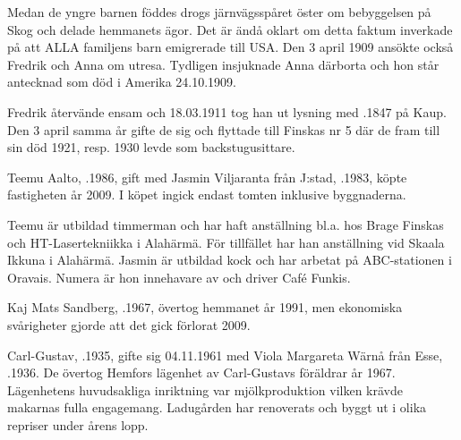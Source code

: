 Medan de yngre barnen föddes drogs järnvägsspåret öster om bebyggelsen på Skog och delade hemmanets ägor. Det är ändå oklart om detta faktum inverkade på att ALLA familjens barn emigrerade till USA. Den 3 april 1909 ansökte också Fredrik och Anna om utresa. Tydligen insjuknade Anna därborta och hon står antecknad som död i Amerika 24.10.1909.

Fredrik återvände ensam och 18.03.1911 tog han ut lysning med  .1847 på Kaup. Den 3 april samma år gifte de sig och flyttade till Finskas nr 5 där de fram till sin död 1921, resp. 1930 levde som backstugusittare.






Teemu Aalto, .1986, gift med Jasmin Viljaranta från J:stad, .1983, köpte fastigheten år 2009. I köpet ingick endast tomten inklusive byggnaderna.

Teemu är utbildad timmerman och har haft anställning bl.a. hos Brage Finskas och HT-Lasertekniikka i Alahärmä. För tillfället har han anställning vid Skaala Ikkuna i Alahärmä. Jasmin är utbildad kock och har arbetat på ABC-stationen i Oravais. Numera är hon innehavare av och driver Café Funkis.
\begin{jhchildren}
  \item {}
  \item {}
  \item {}
\end{jhchildren}


Kaj Mats Sandberg,  .1967, övertog hemmanet år 1991, men ekonomiska svårigheter gjorde att det gick förlorat 2009.\jhvspace{}


Carl-Gustav, .1935, gifte sig 04.11.1961 med Viola Margareta Wärnå från Esse, .1936. De övertog Hemfors lägenhet av Carl-Gustavs föräldrar år 1967. Lägenhetens huvudsakliga inriktning var mjölkproduktion vilken krävde makarnas fulla engagemang. Ladugården har renoverats och byggt ut i olika repriser under årens lopp.


